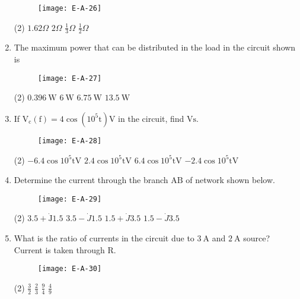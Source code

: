 \begin{enumerate}
\begin{figure}[H]
	\centering
	\texttt{[image: E-A-26]}
	\caption{}
	\label{}
\end{figure}
 \begin{tasks}(2)
	\task[\textbf{a.}]$1.62 \Omega$
	\task[\textbf{b.}]$2 \Omega$
	\task[\textbf{c.}]$\frac{1}{3} \Omega$
	\task[\textbf{d.}]$\frac{1}{2} \Omega$
\end{tasks}
\item The maximum power that can be distributed in the load in the circuit shown is
\begin{figure}[H]
	\centering
	\texttt{[image: E-A-27]}
	\caption{}
	\label{}
\end{figure}
 \begin{tasks}(2)
	\task[\textbf{a.}]$0.396 \mathrm{~W}$
	\task[\textbf{b.}]$6 \mathrm{~W}$
	\task[\textbf{c.}]$6.75 \mathrm{~W}$
	\task[\textbf{d.}]$13.5 \mathrm{~W}$ 
\end{tasks}
\item If $\mathrm{V}_{\mathrm{c}}(\mathrm{f})=4 \cos \left(10^{5} \mathrm{t}\right) \mathrm{V}$ in the circuit, find $\mathrm{Vs}$.
\begin{figure}[H]
	\centering
	\texttt{[image: E-A-28]}
	\caption{}
	\label{}
\end{figure}
 \begin{tasks}(2)
	\task[\textbf{a.}]$-6.4 \cos 10^{5} \mathrm{t} \mathrm{V}$
	\task[\textbf{b.}]$2.4 \cos 10^{5} \mathrm{t} \mathrm{V}$
	\task[\textbf{c.}]$6.4 \cos 10^{5} \mathrm{t} \mathrm{V}$
	\task[\textbf{d.}]$-2.4 \cos 10^{5} \mathrm{t} \mathrm{V}$ 
\end{tasks}
\item Determine the current through the branch $\mathrm{AB}$ of network shown below.
\begin{figure}[H]
	\centering
	\texttt{[image: E-A-29]}
	\caption{}
	\label{}
\end{figure}
 \begin{tasks}(2)
	\task[\textbf{a.}]$3.5+\dot{\mathrm{J}} 1.5$
	\task[\textbf{b.}]$3.5-\dot{J} 1.5$
	\task[\textbf{c.}]$1.5+\dot{J} 3.5$
	\task[\textbf{d.}]$1.5-\dot{J} 3.5$ 
\end{tasks}
\item What is the ratio of currents in the circuit due to $3 \mathrm{~A}$ and $2 \mathrm{~A}$ source? Current is taken through $\mathrm{R}$.
\begin{figure}[H]
	\centering
	\texttt{[image: E-A-30]}
	\caption{}
	\label{}
\end{figure}
 \begin{tasks}(2)
	\task[\textbf{a.}]$\frac{3}{2}$
	\task[\textbf{b.}]$\frac{2}{3}$
	\task[\textbf{c.}]$\frac{9}{4}$
	\task[\textbf{d.}] $\frac{4}{9}$ 
\end{tasks}
\end{enumerate}